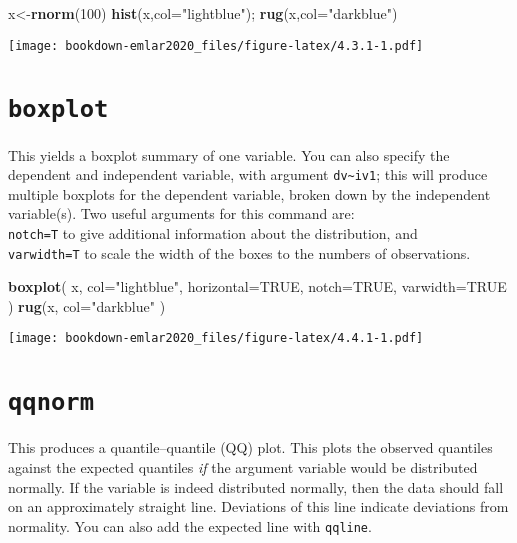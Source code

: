 \documentclass[]{book}
\newenvironment{Shaded}{\begin{snugshade}}{\end{snugshade}}
\newcommand{\DataTypeTok}[1]{\textcolor[rgb]{0.13,0.29,0.53}{#1}}
\newcommand{\DecValTok}[1]{\textcolor[rgb]{0.00,0.00,0.81}{#1}}
\newcommand{\KeywordTok}[1]{\textcolor[rgb]{0.13,0.29,0.53}{\textbf{#1}}}
\newcommand{\NormalTok}[1]{#1}
\newcommand{\OtherTok}[1]{\textcolor[rgb]{0.56,0.35,0.01}{#1}}
\newcommand{\StringTok}[1]{\textcolor[rgb]{0.31,0.60,0.02}{#1}}
\begin{document}
\begin{Shaded}
\begin{Highlighting}[]
\NormalTok{x<-}\KeywordTok{rnorm}\NormalTok{(}\DecValTok{100}\NormalTok{) }
\KeywordTok{hist}\NormalTok{(x,}\DataTypeTok{col=}\StringTok{"lightblue"}\NormalTok{); }\KeywordTok{rug}\NormalTok{(x,}\DataTypeTok{col=}\StringTok{"darkblue"}\NormalTok{)}
\end{Highlighting}
\end{Shaded}

\texttt{[image: bookdown-emlar2020\_files/figure-latex/4.3.1-1.pdf]}

\hypertarget{boxplot}{%
\section{\texorpdfstring{\texttt{boxplot}}{boxplot}}\label{boxplot}}

This yields a
boxplot summary \citep{tukey77} of one variable. You can also specify the
dependent and independent variable, with argument
\texttt{dv\textasciitilde{}iv1}; this will produce multiple
boxplots for the dependent variable, broken down by the independent
variable(s).
Two useful arguments for this command are:\\
\texttt{notch=T} to give additional information
about the distribution, and\\
\texttt{varwidth=T} to scale the width of the boxes
to the numbers of observations.

\begin{Shaded}
\begin{Highlighting}[]
\KeywordTok{boxplot}\NormalTok{( x, }\DataTypeTok{col=}\StringTok{"lightblue"}\NormalTok{, }\DataTypeTok{horizontal=}\OtherTok{TRUE}\NormalTok{, }\DataTypeTok{notch=}\OtherTok{TRUE}\NormalTok{, }\DataTypeTok{varwidth=}\OtherTok{TRUE}\NormalTok{ )}
\KeywordTok{rug}\NormalTok{(x, }\DataTypeTok{col=}\StringTok{"darkblue"}\NormalTok{ )}
\end{Highlighting}
\end{Shaded}

\texttt{[image: bookdown-emlar2020\_files/figure-latex/4.4.1-1.pdf]}

\hypertarget{qqnorm}{%
\section{\texorpdfstring{\texttt{qqnorm}}{qqnorm}}\label{qqnorm}}

This produces a quantile--quantile (QQ) plot. This plots the
observed quantiles against the expected quantiles \emph{if} the argument
variable would be distributed normally. If the variable is indeed
distributed normally, then the data should fall on an approximately
straight line. Deviations of this line indicate deviations from
normality. You can also add the expected line with
\texttt{qqline}.
\end{document}
